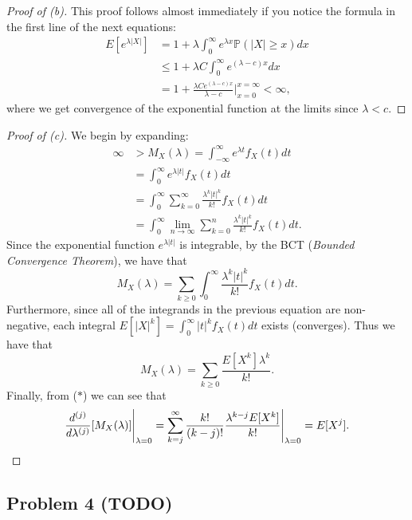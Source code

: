 \documentclass[12pt,reqno]{article}
\renewcommand{\emph}[1]{\textit{#1}}
\theoremstyle{plain}
\theoremstyle{definition}
\newcommand{\PP}[1]{\ensuremath{\mathbb{P}\left(#1\right)}}
\begin{document}
\begin{proof}[Proof of (b)] 
This proof follows almost immediately if you notice the formula in the 
first line of the next equations:
\begin{align*} 
E[e^{\lambda |X|}] & = 1 + \lambda \int_0^{\infty} e^{\lambda x} 
     \PP{|X| \geq x} dx \\ 
     & \leq 1 + \lambda C \int_0^{\infty} e^{(\lambda-c)x} dx \\ 
     & = 1 + \frac{\lambda C e^{(\lambda-c)x}}{\lambda - c} 
     \Biggr\rvert_{x=0}^{x=\infty} < \infty, 
\end{align*} 
where we get convergence of the exponential function at the limits 
since $\lambda < c$. 
\end{proof} 
\begin{proof}[Proof of (c)] 
We begin by expanding:
\begin{align*} 
\infty & > M_X(\lambda) = \int_{-\infty}^{\infty} e^{\lambda t} f_X(t) dt \\ 
     & = \int_0^{\infty} e^{\lambda |t|} f_X(t) dt \\ 
     & = \int_0^{\infty} \sum_{k=0}^{\infty} \frac{\lambda^k |t|^k}{k!} 
     f_X(t) dt \\ 
     & = \int_0^{\infty} \lim_{n \rightarrow \infty} \sum_{k=0}^n 
     \frac{\lambda^k |t|^k}{k!} f_X(t) dt. 
\end{align*} 
Since the exponential function $e^{\lambda |t|}$ is integrable, by the 
BCT (\emph{Bounded Convergence Theorem}), we have that 
\[
\tag{$\ast$} 
M_X(\lambda) = \sum_{k \geq 0} \int_0^{\infty} \frac{\lambda^k |t|^k}{k!} 
     f_X(t) dt. 
\]
Furthermore, since all of the integrands in the previous equation are 
non-negative, each integral $E[|X|^k] = \int_0^{\infty} |t|^k f_X(t) dt$ 
exists (converges). Thus we have that 
\[
M_X(\lambda) = \sum_{k \geq 0} \frac{E[X^k] \lambda^k}{k!}. 
\]
Finally, from ($\ast$) we can see that 
\[
\frac{d^{(j)}}{d\lambda^{(j)}}[M_X(\lambda)] \Biggr\rvert_{\lambda=0} = 
     \sum_{k=j}^{\infty} \frac{k!}{(k-j)!} \frac{\lambda^{k-j} E[X^k]}{k!} 
     \Biggr\rvert_{\lambda=0} = E[X^j].
     \qedhere
\]
\end{proof} 

\subsection{Problem 4 (TODO)}
\end{document}
